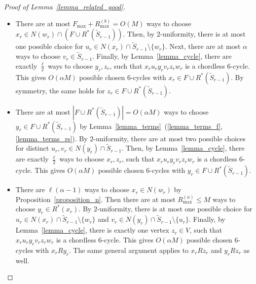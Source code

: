 \documentclass{article}
\theoremstyle{plain}
\theoremstyle{remark}
\theoremstyle{plain}
\numberwithin{equation}{section}
\begin{document}
\begin{proof}[Proof of Lemma~\ref{lemma_related_good}]
		\begin{itemize}
			\item There are at most $F_{\max}+R_{\max}^{(b)}=O(M)$ ways to choose $x_r\in N(w_r)\cap(F\cup R^*(\widetilde{S}_{r-1}))$. Then, by $2$-uniformity, there is at most one possible choice for $u_r\in N(x_r)\cap\widetilde{S}_{r-1}\setminus\{w_r\}$. Next, there are at most $\alpha$ ways to choose $v_r\in\widetilde{S}_{r-1}$. Finally, by Lemma~\ref{lemma_cycle}, there are exactly $\tfrac{\ell}{2}$ ways to choose $y_r,z_r$, such that $x_ru_ry_rv_rz_rw_r$ is a chordless $6$-cycle. This gives $O(\alpha M)$ possible chosen $6$-cycles with $x_r\in F\cup R^*(\widetilde{S}_{r-1})$. By symmetry, the same holds for $z_r\in F\cup R^*(\widetilde{S}_{r-1})$.
			\item There are at most $|F\cup R^*(\widetilde{S}_{r-1})|=O(\alpha M)$ ways to choose $y_r\in F\cup R^*(\widetilde{S}_{r-1})$ by Lemma~\ref{lemma_terms}~(\ref{lemma_terms_f},\ref{lemma_terms_rs}). By $2$-uniformity, there are at most two possible choices for distinct $u_r,v_r\in N(y_r)\cap\widetilde{S}_{r-1}$. Then, by Lemma~\ref{lemma_cycle}, there are exactly $\tfrac{\ell}{2}$ ways to choose $x_r,z_r$, such that $x_ru_ry_rv_rz_rw_r$ is a chordless $6$-cycle. This gives $O(\alpha M)$ possible chosen $6$-cycles with $y_r\in F\cup R^*(\widetilde{S}_{r-1})$.
			\item There are $\ell(\alpha-1)$ ways to choose $x_r\in N(w_r)$ by Proposition~\ref{proposition_n}. Then there are at most $R_{\max}^{(a)}\leq M$ ways to choose $y_r\in R^*(x_r)$. By $2$-uniformity, there is at most one possible choice for $u_r\in N(x_r)\cap\widetilde{S}_{r-1}\setminus\{w_r\}$ and $v_r\in N(y_r)\cap\widetilde{S}_{r-1}\setminus\{u_r\}$. Finally, by Lemma~\ref{lemma_cycle}, there is exactly one vertex $z_r\in V$, such that $x_ru_ry_rv_rz_rw_r$ is a chordless $6$-cycle. This gives $O(\alpha M)$ possible chosen $6$-cycles with $x_rRy_r$. The same general argument applies to $x_rRz_r$ and $y_rRz_r$ as well.
		\end{itemize}
		

\end{proof}
\end{document}
